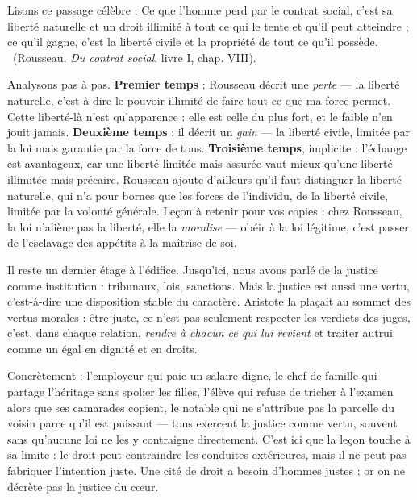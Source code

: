 \documentclass[11pt]{article}
\newcommand{\cle}[1]{{\popxbold\color{popdark}#1}}
\newcounter{popsec}
\newcounter{popsub}
\newcommand{\courssub}[1]{%
  \stepcounter{popsub}%
  \par\vspace{9pt}\noindent{\popxbold\fontsize{11.5}{13}\selectfont\color{popink}{\color{poporange}\thepopsec.\thepopsub}\hspace{6pt}#1}\par\nopagebreak\vspace{4pt}
}
\begin{document}
\begin{experience}
Lisons ce passage célèbre : \guillemotleft Ce que l'homme perd par le contrat social, c'est sa liberté naturelle et un droit illimité à tout ce qui le tente et qu'il peut atteindre ; ce qu'il gagne, c'est la liberté civile et la propriété de tout ce qu'il possède. \guillemotright\ (Rousseau, \emph{Du contrat social}, livre I, chap. VIII).

Analysons pas à pas. \textbf{Premier temps} : Rousseau décrit une \emph{perte} — la liberté naturelle, c'est-à-dire le pouvoir illimité de faire tout ce que ma force permet. Cette liberté-là n'est qu'apparence : elle est celle du plus fort, et le faible n'en jouit jamais. \textbf{Deuxième temps} : il décrit un \emph{gain} — la liberté civile, limitée par la loi mais garantie par la force de tous. \textbf{Troisième temps}, implicite : l'échange est avantageux, car une liberté limitée mais assurée vaut mieux qu'une liberté illimitée mais précaire. Rousseau ajoute d'ailleurs qu'il faut distinguer la liberté naturelle, qui n'a pour bornes que les forces de l'individu, de la liberté civile, limitée par la volonté générale. Leçon à retenir pour vos copies : chez Rousseau, la loi n'aliène pas la liberté, elle la \emph{moralise} — obéir à la loi légitime, c'est passer de l'esclavage des appétits à la maîtrise de soi.
\end{experience}

\courssub{La justice comme vertu personnelle}

Il reste un dernier étage à l'édifice. Jusqu'ici, nous avons parlé de la justice comme institution : tribunaux, lois, sanctions. Mais la justice est aussi une \cle{vertu}, c'est-à-dire une disposition stable du caractère. Aristote la plaçait au sommet des vertus morales : être juste, ce n'est pas seulement respecter les verdicts des juges, c'est, dans chaque relation, \emph{rendre à chacun ce qui lui revient} et traiter autrui comme un égal en dignité et en droits.

Concrètement : l'employeur qui paie un salaire digne, le chef de famille qui partage l'héritage sans spolier les filles, l'élève qui refuse de tricher à l'examen alors que ses camarades copient, le notable qui ne s'attribue pas la parcelle du voisin parce qu'il est puissant — tous exercent la justice comme vertu, souvent sans qu'aucune loi ne les y contraigne directement. C'est ici que la leçon touche à sa limite : le droit peut contraindre les conduites extérieures, mais il ne peut pas fabriquer l'intention juste. Une cité de droit a besoin d'hommes justes ; or on ne décrète pas la justice du cœur.
\end{document}
